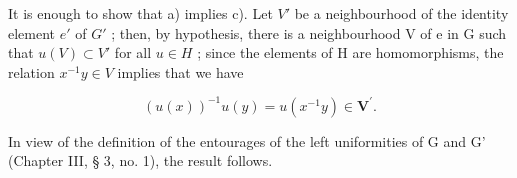 It is enough to show that a) implies c). Let \(V'\) be a neighbourhood of the identity element \(e'\) of \(G'\) ; then, by hypothesis, there is a neighbourhood V of e in G such that \(u(V) \subset V'\) for all \(u \in H\) ; since the elements of H are homomorphisms, the relation \(x^{-1}y \in V\) implies that we have

\[
(u (x)) ^ {- 1} u (y) = u (x ^ {- 1} y) \in \mathbf {V} ^ {\prime}.
\]

In view of the definition of the entourages of the left uniformities of G and G' (Chapter III, § 3, no. 1), the result follows.

